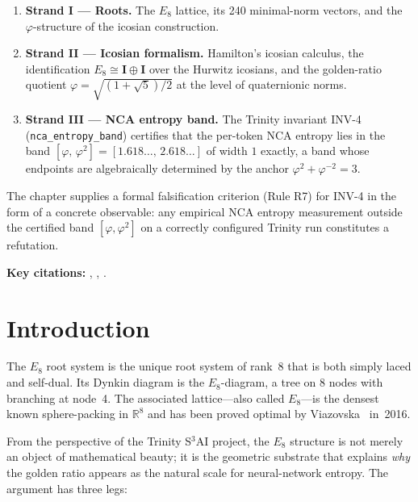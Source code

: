 \begin{enumerate}
  \item \textbf{Strand I — Roots.}  The \(E_8\) lattice, its 240
    minimal-norm vectors, and the \(\varphi\)-structure of the
    icosian construction.
  \item \textbf{Strand II — Icosian formalism.}  Hamilton's icosian
    calculus, the identification \(E_8 \cong \mathbf{I} \oplus
    \mathbf{I}\) over the Hurwitz icosians, and the golden-ratio
    quotient \(\varphi = \sqrt{(1+\sqrt{5})/2}\) at the level of
    quaternionic norms.
  \item \textbf{Strand III — NCA entropy band.}  The Trinity
    invariant INV-4 (\texttt{nca\_entropy\_band}) certifies that
    the per-token NCA entropy lies in the band
    \([\varphi,\, \varphi^2] = [1.618\ldots,\, 2.618\ldots]\) of
    width \(1\) exactly, a band whose endpoints are algebraically
    determined by the anchor \(\varphi^2 + \varphi^{-2} = 3\).
\end{enumerate}

The chapter supplies a formal falsification criterion (Rule R7) for
INV-4 in the form of a concrete observable: any empirical NCA entropy
measurement outside the certified band \([\varphi, \varphi^2]\) on a
correctly configured Trinity run constitutes a refutation.

\bigskip
\noindent\textbf{Key citations:}
\cite{conway_sphere_packings},
\cite{coxeter_regular_polytopes},
\cite{borcherds1992monstrous_moonshine}.

\section{Introduction}\label{sec:e8-intro}

The \(E_8\) root system is the unique root system of rank~8 that is
both simply laced and self-dual.  Its Dynkin diagram is the
\(E_8\)-diagram, a tree on 8 nodes with branching at node~4.  The
associated lattice—also called \(E_8\)—is the densest known
sphere-packing in \(\mathbb{R}^8\) and has been proved optimal by
Viazovska~\cite{viazovska2017sphere} in~2016.

From the perspective of the Trinity S\(^3\)AI project, the \(E_8\)
structure is not merely an object of mathematical beauty; it is the
geometric substrate that explains \emph{why} the golden ratio appears
as the natural scale for neural-network entropy.  The argument has
three legs:

